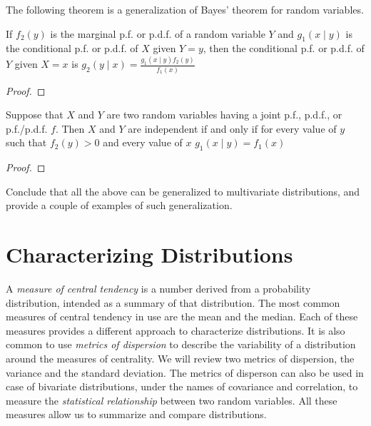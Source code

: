 {\color{red} The following theorem is a generalization of Bayes' theorem for random variables.}

\begin{theorem}
If $f_{2}\left(y\right)$ is the marginal p.f. or p.d.f. of a random variable $Y$ and $g_{1}\left(x\mid y\right)$ is the conditional p.f. or p.d.f. of $X$ given $Y=y$, then the conditional p.f. or p.d.f. of $Y$ given $X=x$ is $g_{2}\left(y\mid x\right)=\frac{g_{1}\left(x\mid y\right)f_{2}\left(y\right)}{f_{1}\left(x\right)}$
\end{theorem}
\begin{proof}
\end{proof}

\begin{proposition}
Suppose that $X$ and $Y$ are two random variables having a joint p.f., p.d.f., or p.f./p.d.f. $f$. Then $X$ and $Y$ are independent if and only if for every value of $y$ such that $f_{2}\left(y\right)>0$ and every value of $x$ $g_{1}\left(x\mid y\right)=f_{1}\left(x\right)$
\end{proposition}
\begin{proof}
\end{proof}

{\color{red} Conclude that all the above can be generalized to multivariate distributions, and provide a couple of examples of such generalization.}


%
%

\section{Characterizing Distributions}
\label{sec:probability_expectation}

A \emph{measure of central tendency} is a number derived from a probability distribution, intended as a summary of that distribution. The most common measures of central tendency in use are the mean and the median. Each of these measures provides a different approach to characterize distributions. It is also common to use \emph{metrics of dispersion} to describe the variability of a distribution around the measures of centrality. We will review two metrics of dispersion, the variance and the standard deviation. The metrics of disperson can also be used in case of bivariate distributions, under the names of covariance and correlation, to measure the \emph{statistical relationship} between two random variables. All these measures allow us to summarize and compare distributions.

